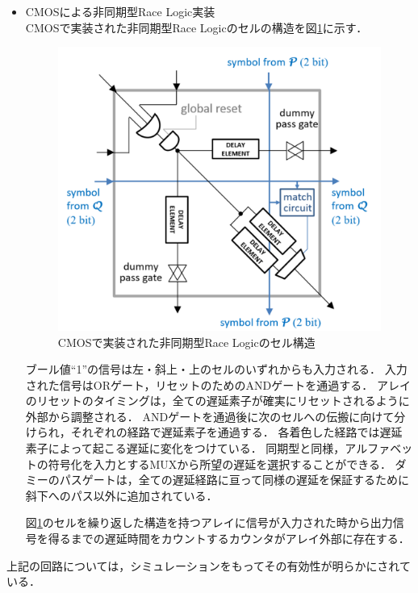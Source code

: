 \begin{itemize}
ブール値“1”の信号は左・斜上・上のセルのいずれからも入力される．
入力された信号はORゲートを通過して、飽和アップカウンタにおいてNクロックサイクルに0をカウントする．この飽和アップカウンタをクロックと同期させる．
これにより，1つのセルを通過し，右・下のセルへと伝搬する際に1クロックサイクルを要する．
各着色ゲートでは伝搬信号に対してそれぞれ違う伝搬遅延時間を付加し，
MUXで所望の伝搬遅延時間を付加するゲートからの出力を選択することができる．
生成される出力信号がパルスではなく固定ブール値“1”であることを確実にするために，到着回路のセットが配置され，各計算の最後にリセットされている．

図\ref{fig:CMOSsync}のセルを繰り返した構造を持つアレイに信号が入力された時から出力信号を得るまでのクロック数をカウントするカウンタがアレイ外部に存在する．
このカウンタが計測した値が最短経路をパスした時のクロック数となる．

\item CMOSによる非同期型Race Logic実装\\
CMOSで実装された非同期型Race Logicのセルの構造を図\ref{fig:CMOSasync}に示す．
\begin{figure}[t!]
\begin{center}
\includegraphics[keepaspectratio,scale=0.3]{fig/2/CMOSasync.png}
\caption{CMOSで実装された非同期型Race Logicのセル構造\cite{madhavan20174}}
\label{fig:CMOSasync}
\end{center}
\end{figure}

ブール値“1”の信号は左・斜上・上のセルのいずれからも入力される．
入力された信号はORゲート，リセットのためのANDゲートを通過する．
アレイのリセットのタイミングは，全ての遅延素子が確実にリセットされるように外部から調整される．
ANDゲートを通過後に次のセルへの伝搬に向けて分けられ，それぞれの経路で遅延素子を通過する．
各着色した経路では遅延素子によって起こる遅延に変化をつけている．
同期型と同様，アルファベットの符号化を入力とするMUXから所望の遅延を選択することができる．
ダミーのパスゲートは，全ての遅延経路に亘って同様の遅延を保証するために斜下へのパス以外に追加されている．

図\ref{fig:CMOSasync}のセルを繰り返した構造を持つアレイに信号が入力された時から出力信号を得るまでの遅延時間をカウントするカウンタがアレイ外部に存在する．
\end{itemize}
上記の回路については，シミュレーションをもってその有効性が明らかにされている．


